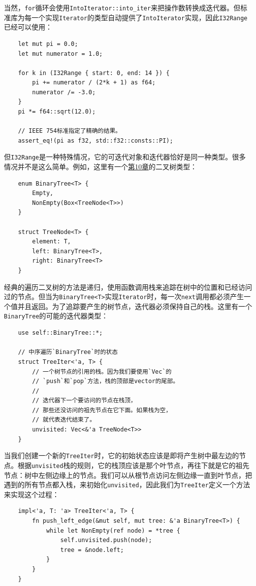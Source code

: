 当然，\texttt{for}循环会使用\texttt{IntoIterator::into\_iter}来把操作数转换成迭代器。但标准库为每一个实现\texttt{Iterator}的类型自动提供了\texttt{IntoIterator}实现，因此\texttt{I32Range}已经可以使用：
\begin{verbatim}
    let mut pi = 0.0;
    let mut numerator = 1.0;

    for k in (I32Range { start: 0, end: 14 }) {
        pi += numerator / (2*k + 1) as f64;
        numerator /= -3.0;
    }
    pi *= f64::sqrt(12.0);

    // IEEE 754标准指定了精确的结果。
    assert_eq!(pi as f32, std::f32::consts::PI);
\end{verbatim}

但\texttt{I32Range}是一种特殊情况，它的可迭代对象和迭代器恰好是同一种类型。很多情况并不是这么简单。例如，这里有一个\hyperref[ch10]{第10章}的二叉树类型：
\begin{verbatim}
    enum BinaryTree<T> {
        Empty,
        NonEmpty(Box<TreeNode<T>>)
    }

    struct TreeNode<T> {
        element: T,
        left: BinaryTree<T>,
        right: BinaryTree<T>
    }
\end{verbatim}

经典的遍历二叉树的方法是递归，使用函数调用栈来追踪在树中的位置和已经访问过的节点。但当为\texttt{BinaryTree<T>}实现\texttt{Iterator}时，每一次\texttt{next}调用都必须产生一个值并且返回。为了追踪要产生的树节点，迭代器必须保持自己的栈。这里有一个\texttt{BinaryTree}的可能的迭代器类型：
\begin{verbatim}
    use self::BinaryTree::*;

    // 中序遍历`BinaryTree`时的状态
    struct TreeIter<'a, T> {
        // 一个树节点的引用的栈。因为我们要使用`Vec`的
        // `push`和`pop`方法，栈的顶部是vector的尾部。
        //
        // 迭代器下一个要访问的节点在栈顶，
        // 那些还没访问的祖先节点在它下面。如果栈为空，
        // 就代表迭代结束了。
        unvisited: Vec<&'a TreeNode<T>>
    }
\end{verbatim}

当我们创建一个新的\texttt{TreeIter}时，它的初始状态应该是即将产生树中最左边的节点。根据\texttt{unvisited}栈的规则，它的栈顶应该是那个叶节点，再往下就是它的祖先节点：树中左侧边缘上的节点。我们可以从根节点访问左侧边缘一直到叶节点，把遇到的所有节点都入栈，来初始化\texttt{unvisited}，因此我们为\texttt{TreeIter}定义一个方法来实现这个过程：
\begin{verbatim}
    impl<'a, T: 'a> TreeIter<'a, T> {
        fn push_left_edge(&mut self, mut tree: &'a BinaryTree<T>) {
            while let NonEmpty(ref node) = *tree {
                self.unvisited.push(node);
                tree = &node.left;
            }
        }
    }
\end{verbatim}

